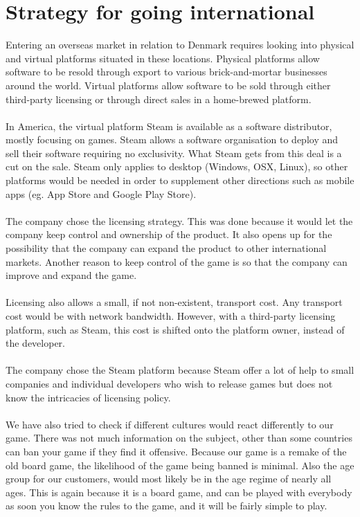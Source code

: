 	\section{Strategy for going international}
	Entering an overseas market in relation to Denmark requires looking into
   physical and virtual platforms situated in these locations. Physical
    platforms allow software to be resold through export to various
     brick-and-mortar businesses around the world. Virtual platforms allow
      software to be sold through either third-party licensing or through
       direct sales in a home-brewed platform.
	\\
	\\
	In America, the virtual platform Steam is available as a software
   distributor, mostly focusing on games. Steam allows a software
   organisation to deploy and sell their software requiring no exclusivity.
    What Steam gets from this deal is a cut on the sale. Steam only applies
     to desktop (Windows, OSX, Linux), so other platforms would be needed in
      order to supplement other directions such as mobile
      apps (eg. App Store and Google Play Store).
	\\
	\\
	The company chose the licensing strategy. This was done because it would
   let the company keep control and ownership of the product. It also opens
    up for the possibility that the company can expand the product to other
     international markets. Another reason to keep control of the game is so
      that the company can improve and expand the game.
	\\
	\\
	Licensing also allows a small, if not non-existent, transport cost. Any
   transport cost would be with network bandwidth. However, with a third-party
    licensing platform, such as Steam, this cost is shifted onto the
     platform owner, instead of the developer.
	\\
	\\
	The company chose the Steam platform because Steam offer a lot of help
   to small companies and individual developers who wish to release games
    but does not know the intricacies of licensing policy.
	\\
	\\
	We have also tried to check if different cultures would react differently
   to our game. There was not much information on the subject, other than
   some countries can ban your game if they find it offensive. Because our
   game is a remake of the old board game, the likelihood of the game being
    banned is minimal. Also the age group for our customers, would most
    likely be in the age regime of nearly all ages. This is again because
     it is a board game, and can be played with everybody as soon you know
     the rules to the game, and it will be fairly simple to play.

